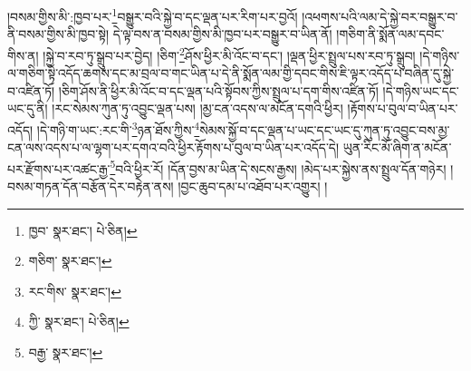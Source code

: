 །བསམ་གྱིས་མི་:ཁྱབ་པར་\footnote{ཁྱབ་  སྣར་ཐང་།  པེ་ཅིན། }བསྒྱུར་བའི་སྐྱེ་བ་དང་ལྡན་པར་རིག་པར་བྱའོ། །འཕགས་པའི་ལམ་དེ་སྐྱེ་བར་བསྒྱུར་བ་ནི་བསམ་གྱིས་མི་ཁྱབ་སྟེ། དེ་ལྟ་བས་ན་བསམ་གྱིས་མི་ཁྱབ་པར་བསྒྱུར་བ་ཡིན་ནོ། །གཅིག་ནི་སྨོན་ལམ་དབང་གིས་ན། །སྐྱེ་བ་རབ་ཏུ་སྒྲུབ་པར་བྱེད། །ཅིག་\footnote{གཅིག་  སྣར་ཐང་། }ཤོས་ཕྱིར་མི་འོང་བ་དང་། །ལྡན་ཕྱིར་སྤྲུལ་པས་རབ་ཏུ་སྒྲུབ། །དེ་གཉིས་ལ་གཅིག་སྟེ་འདོད་ཆགས་དང་མ་བྲལ་བ་གང་ཡིན་པ་དེ་ནི་སྨོན་ལམ་གྱི་དབང་གིས་ཇི་ལྟར་འདོད་པ་བཞིན་དུ་སྐྱེ་བ་འཛིན་ཏོ། །ཅིག་ཤོས་ནི་ཕྱིར་མི་འོང་བ་དང་ལྡན་པའི་སྟོབས་ཀྱིས་སྤྲུལ་པ་དག་གིས་འཛིན་ཏོ། །དེ་གཉིས་ཡང་དང་ཡང་དུ་ནི། །རང་སེམས་ཀུན་ཏུ་འབྱུང་ལྡན་པས། །མྱ་ངན་འདས་ལ་མངོན་དགའི་ཕྱིར། །རྟོགས་པ་བུལ་བ་ཡིན་པར་འདོད། །དེ་གཉི་ག་ཡང་:རང་གི་\footnote{རང་གིས་  སྣར་ཐང་། }ཉན་ཐོས་ཀྱིས་\footnote{ཀྱི་  སྣར་ཐང་།  པེ་ཅིན། }སེམས་སྐྱོ་བ་དང་ལྡན་པ་ཡང་དང་ཡང་དུ་ཀུན་ཏུ་འབྱུང་བས་མྱ་ངན་ལས་འདས་པ་ལ་ལྷག་པར་དགའ་བའི་ཕྱིར་རྟོགས་པ་བུལ་བ་ཡིན་པར་འདོད་དེ། ཡུན་རིང་མོ་ཞིག་ན་མངོན་པར་རྫོགས་པར་འཚང་རྒྱ་\footnote{བརྒྱ་  སྣར་ཐང་། }བའི་ཕྱིར་རོ། །དོན་བྱས་མ་ཡིན་དེ་སངས་རྒྱས། །མེད་པར་སྐྱེས་ནས་སྤྲུལ་དོན་གཉེར། །བསམ་གཏན་དོན་བརྩོན་དེར་བརྟེན་ནས། །བྱང་ཆུབ་དམ་པ་འཐོབ་པར་འགྱུར། །

